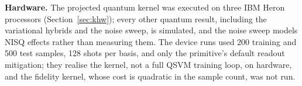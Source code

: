 \textbf{Hardware.} The projected quantum kernel was executed on three IBM Heron processors
(Section~\ref{sec:khw}); every other quantum result, including the variational hybrids and the noise
sweep, is simulated, and the noise sweep models NISQ effects rather than measuring them. The device runs
used 200 training and 500 test samples, 128 shots per basis, and only the primitive's default readout
mitigation; they realise the kernel, not a full QSVM training loop, on hardware, and the fidelity kernel,
whose cost is quadratic in the sample count, was not run.